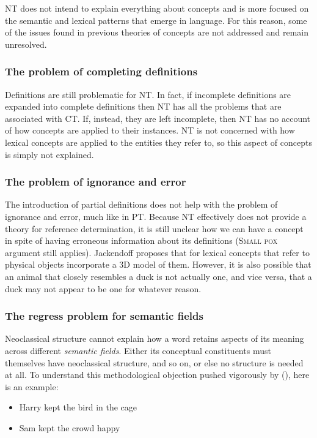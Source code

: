 NT does not intend to explain everything about concepts and is more focused on the semantic and lexical patterns that emerge in language. For this reason, some of the issues found in previous theories of concepts are not addressed and remain unresolved.

\subsubsection*{The problem of completing definitions}
Definitions are still problematic for NT. In fact, if incomplete definitions are expanded into complete definitions then NT has all the problems that are associated with CT. If, instead, they are left incomplete, then NT has no account of how concepts are applied to their instances. NT is not concerned with how lexical concepts are applied to the entities they refer to, so this aspect of concepts is simply not explained.

\subsubsection*{The problem of ignorance and error}
The introduction of partial definitions does not help with the problem of ignorance and error, much like in PT. Because NT effectively does not provide a theory for reference determination, it is still unclear how we can have a concept in spite of having erroneous information about its definitions (\textsc{Small pox} argument still applies). Jackendoff proposes that for lexical concepts that refer to physical objects incorporate a 3D model of them. However, it is also possible that an animal that closely resembles a duck is not actually one, and vice versa, that a duck may not appear to be one for whatever reason.

\subsubsection*{The regress problem for semantic fields}\label{sec:the-regress-problem-for-semantic-fields}
Neoclassical structure cannot explain how a word retains aspects of its meaning across different \emph{semantic fields}. Either its conceptual constituents must themselves have neoclassical structure, and so on, or else no structure is needed at all. To understand this methodological objection pushed vigorously by  \citeauthor{Fodor1998} (\citeyear[p . 50]{Fodor1998}), here is an example:
\begin{itemize}
	\singlespacing
	\item Harry kept the bird in the cage
	\item Sam kept the crowd happy
\end{itemize} 

